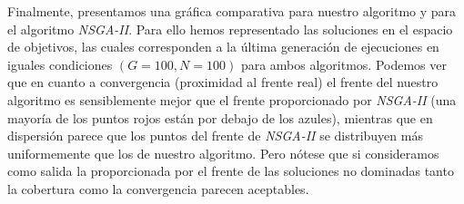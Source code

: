 Finalmente, presentamos una gráfica comparativa para nuestro algoritmo y para el algoritmo \textit{NSGA-II}. Para ello hemos representado las soluciones en el espacio de objetivos, las cuales corresponden a la última generación de ejecuciones en iguales condiciones $(G=100, N=100)$ para ambos algoritmos. Podemos ver que en cuanto a convergencia (proximidad al frente real) el frente del nuestro algoritmo es sensiblemente mejor que el frente proporcionado por  \textit{NSGA-II} (una mayoría de los puntos rojos están por debajo de los azules), mientras que en dispersión parece que los puntos del frente de \textit{NSGA-II} se distribuyen más uniformemente que los de nuestro algoritmo. Pero nótese que si consideramos como salida la proporcionada por el frente de las soluciones no dominadas tanto la cobertura como la convergencia parecen aceptables.\\

